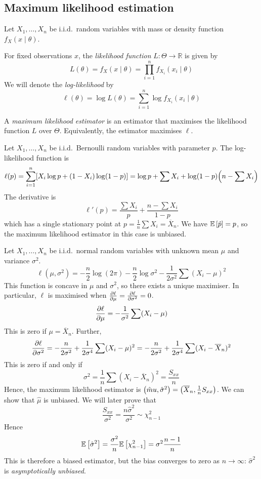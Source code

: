 \subsection{Maximum likelihood estimation}
Let \( X_1, \dots, X_n \) be i.i.d.\ random variables with mass or density function \( f_X(x \mid \theta) \).
\begin{definition}
	For fixed observations \( x \), the \textit{likelihood function} \( L \colon \Theta \to \mathbb R \) is given by
	\[ L(\theta) = f_X(x \mid \theta) = \prod_{i=1}^n f_{X_i} (x_i \mid \theta) \]
	We will denote the \textit{log-likelihood} by
	\[ \ell(\theta) = \log L(\theta) = \sum_{i=1}^n \log f_{X_i} (x_i \mid \theta) \]
\end{definition}
\begin{definition}
	A \textit{maximum likelihood estimator} is an estimator that maximises the likelihood function \( L \) over \( \Theta \).
	Equivalently, the estimator maximises \( \ell \).
\end{definition}
\begin{example}
	Let \( X_1, \dots, X_n \) be i.i.d.\ Bernoulli random variables with parameter \( p \).
	The log-likelihood function is
	\[ \ell(p) = \sum_{i=1}^n [X_i \log p + (1-X_i) \log (1-p)] = \log p + \sum X_i + \log(1-p) \qty(n - \sum X_i) \]
	The derivative is
	\[ \ell'(p) = \frac{\sum X_i}{p} + \frac{n - \sum X_i}{1-p} \]
	which has a single stationary point at \( p = \frac{1}{n} \sum X_i = \overline X_n \).
	We have \( \mathbb{E}\left[{\hat p}\right] = p \), so the maximum likelihood estimator in this case is unbiased.
\end{example}
\begin{example}
	Let \( X_1, \dots, X_n \) be i.i.d.\ normal random variables with unknown mean \( \mu \) and variance \( \sigma^2 \).
	\[ \ell(\mu, \sigma^2) = -\frac{n}{2} \log(2\pi) - \frac{n}{2} \log \sigma^2 - \frac{1}{2\sigma^2} \sum (X_i - \mu)^2 \]
	This function is concave in \( \mu \) and \( \sigma^2 \), so there exists a unique maximiser.
	In particular, \( \ell \) is maximised when \( \pdv{\ell}{\mu} = \pdv{\ell}{\sigma^2} = 0 \).
	\[ \pdv{\ell}{\mu} = -\frac{1}{\sigma^2} \sum (X_i - \mu) \]
	This is zero if \( \mu = \overline X_n \).
	Further,
	\[ \pdv{\ell}{\sigma^2} = -\frac{n}{2\sigma^2} + \frac{1}{2\sigma^4} \sum (X_i - \mu)^2 = -\frac{n}{2\sigma^2} + \frac{1}{2\sigma^4} \sum (X_i - \overline X_n)^2 \]
	This is zero if and only if
	\[ \sigma^2 = \frac{1}{n} \sum (X_i - \overline X_n)^2 = \frac{S_{xx}}{n} \]
	Hence, the maximum likelihood estimator is \( \qty(\hat mu, \hat \sigma^2) = \qty(\overline X_n, \frac{1}{n} S_{xx}) \).
	We can show that \( \hat \mu \) is unbiased.
	We will later prove that
	\[ \frac{S_{xx}}{\sigma^2} = \frac{n\hat \sigma^2}{\sigma^2} \sim \chi_{n-1}^2 \]
	Hence
	\[ \mathbb{E}\left[{\hat \sigma^2}\right] = \frac{\sigma^2}{n} \mathbb{E}\left[{\chi_{n-1}^2}\right] = \sigma^2 \frac{n-1}{n} \]
	This is therefore a biased estimator, but the bias converges to zero as \( n \to \infty \): \( \hat \sigma^2 \) is \textit{asymptotically unbiased}.
\end{example}
